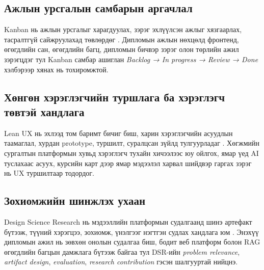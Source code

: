 \subsection{Ажлын урсгалын самбарын аргачлал}
Kanban нь ажлын урсгалыг харагдуулах, зэрэг эхлүүлсэн ажлыг хязгаарлах, тасралтгүй сайжруулахад төвлөрдөг \cite{anderson_kanban_2010}. Дипломын ажлын нөхцөлд фронтенд, өгөгдлийн сан, өгөгдлийн багц, дипломын бичвэр зэрэг олон төрлийн ажил зэрэгцдэг тул Kanban самбар ашиглан \textit{Backlog → In progress → Review → Done} хэлбэрээр хянах нь тохиромжтой.

\subsection{Хөнгөн хэрэглэгчийн туршлага ба хэрэглэгч төвтэй хандлага}
Lean UX нь эхлээд том баримт бичиг биш, харин хэрэглэгчийн асуудлын таамаглал, хурдан prototype, туршилт, суралцсан зүйлд тулгуурладаг \cite{lean_ux_2013}. Хөгжмийн сургалтын платформын хувьд хэрэглэгч тухайн хичээлээс юу ойлгох, ямар үед AI туслахаас асуух, курсийн карт дээр ямар мэдээлэл харвал шийдвэр гаргах зэрэг нь UX туршилтаар тодордог.

\subsection{Зохиомжийн шинжлэх ухаан}
Design Science Research нь мэдээллийн платформын судалгаанд шинэ артефакт бүтээж, түүний хэрэгцээ, зохиомж, үнэлгээг нэгтгэн судлах хандлага юм \cite{hevner_dsr_2004}. Энэхүү дипломын ажил нь зөвхөн онолын судалгаа биш, бодит веб платформ болон RAG өгөгдлийн багцын дамжлага бүтээж байгаа тул DSR-ийн \textit{problem relevance}, \textit{artifact design}, \textit{evaluation}, \textit{research contribution} гэсэн шалгууртай нийцнэ.

